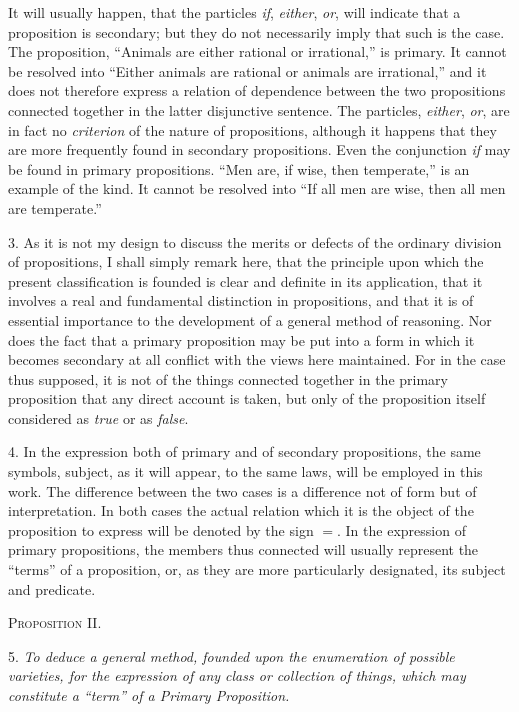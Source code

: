 \documentclass[oneside]{book}
\begin{document}
It will usually happen, that the particles \textit{if}, \textit{either}, \textit{or}, will
indicate that a proposition is secondary; but they do not necessarily
imply that such is the case. The proposition, ``Animals
are either rational or irrational,'' is primary. It cannot be resolved
into ``Either animals are rational or animals are irrational,''
and it does not therefore express a relation of dependence
between the two propositions connected together in the latter
disjunctive sentence. The particles, \textit{either}, \textit{or}, are in fact no
\textit{criterion} of the nature of propositions, although it happens that
they are more frequently found in secondary propositions. Even
the conjunction \textit{if} may be found in primary propositions. ``Men
are, if wise, then temperate,'' is an example of the kind. It
cannot be resolved into ``If all men are wise, then all men are
temperate.''

3. As it is not my design to discuss the merits or defects of
the ordinary division of propositions, I shall simply remark here,
that the principle upon which the present classification is founded
is clear and definite in its application, that it involves a real
and fundamental distinction in propositions, and that it is of
essential importance to the development of a general method of
reasoning. Nor does the fact that a primary proposition may
be put into a form in which it becomes secondary at all conflict
with the views here maintained. For in the case thus supposed,
it is not of the things connected together in the primary proposition
that any direct account is taken, but only of the proposition
itself considered as \textit{true} or as \textit{false}.

4. In the expression both of primary and of secondary propositions,
the same symbols, subject, as it will appear, to the same
laws, will be employed in this work. The difference between
the two cases is a difference not of form but of interpretation.
In both cases the actual relation which it is the object of the
proposition to express will be denoted by the sign $=$. In the
expression of primary propositions, the members thus connected
will usually represent the ``terms'' of a proposition, or, as they
are more particularly designated, its subject and predicate.

\begin{center}
\textsc{Proposition II}.
\end{center}

5. \textit{To deduce a general method, founded upon the enumeration of
possible varieties, for the expression of any class or collection of things,
which may constitute a ``term'' of a Primary Proposition.}
\end{document}
